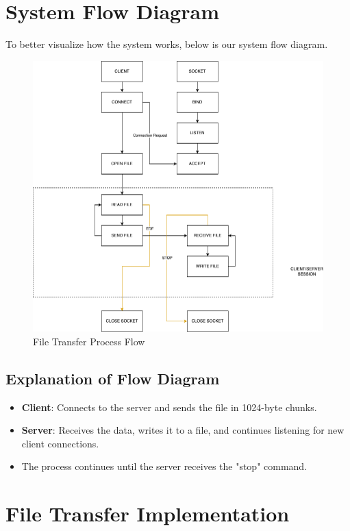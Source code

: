 \documentclass{article}
\begin{document}
\section{System Flow Diagram}

To better visualize how the system works, below is our system flow diagram.


\begin{figure}[h!]
    \centering
    \includegraphics[width=1\textwidth]{flow.png}
    \caption{File Transfer Process Flow}
    \label{fig:flow}
\end{figure}

\subsection{Explanation of Flow Diagram}
\begin{itemize}
    \item \textbf{Client}: Connects to the server and sends the file in 1024-byte chunks.
    \item \textbf{Server}: Receives the data, writes it to a file, and continues listening for new client connections.
    \item The process continues until the server receives the "stop" command.
\end{itemize}


\section{File Transfer Implementation}
\end{document}
